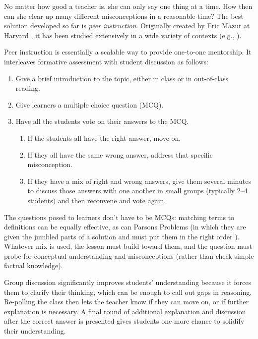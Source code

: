 \documentclass[10pt,letterpaper]{article}
\begin{document}
No matter how good a teacher is, she can only say one thing at a time.  How then
can she clear up many different misconceptions in a reasonable time? The best
solution developed so far is \emph{peer instruction}. Originally created by Eric
Mazur at Harvard \cite{Crou2001}, it has been studied extensively in a wide
variety of contexts (e.g., \cite{Vick2015,Port2016}).

Peer instruction is essentially a scalable way to provide one-to-one mentorship.
It interleaves formative assessment with student discussion as follows:

\begin{enumerate}

\item Give a brief introduction to the topic, either in class or in out-of-class
  reading.

\item Give learners a multiple choice question (MCQ).

\item Have all the students vote on their answers to the MCQ.

  \begin{enumerate}

   \item If the students all have the right answer, move on.

   \item If they all have the same wrong answer, address that specific
     misconception.

   \item If they have a mix of right and wrong answers, give them several
     minutes to discuss those answers with one another in small groups
     (typically 2--4 students) and then reconvene and vote again.

  \end{enumerate}

\end{enumerate}

The questions posed to learners don't have to be MCQs: matching terms to
definitions can be equally effective, as can Parsons Problems (in which they are
given the jumbled parts of a solution and must put them in the right order
\cite{Pars2006}).  Whatever mix is used, the lesson must build toward them, and
the question must probe for conceptual understanding and misconceptions (rather
than check simple factual knowledge).

Group discussion significantly improves students' understanding because it
forces them to clarify their thinking, which can be enough to call out gaps in
reasoning.  Re-polling the class then lets the teacher know if they can move on,
or if further explanation is necessary. A final round of additional explanation
and discussion after the correct answer is presented gives students one more
chance to solidify their understanding.
\end{document}
